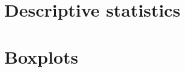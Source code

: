 \documentclass[10pt,a4paper]{article}
\begin{document}
\section*{Descriptive statistics}

\section*{Boxplots}
\end{document}
